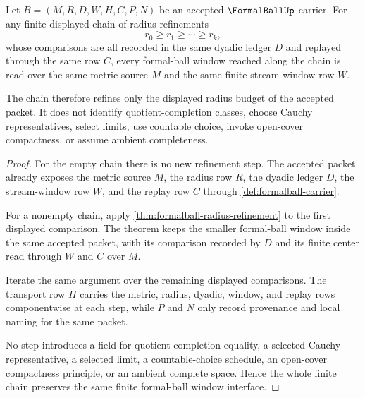 \begin{theorem}
\label{thm:formalball-radius-refinement-chain}
Let $B=(M,R,D,W,H,C,P,N)$ be an accepted $\FormalBallUp$ carrier. For any finite displayed chain of radius refinements
$$
r_0 \ge r_1 \ge \cdots \ge r_k ,
$$
whose comparisons are all recorded in the same dyadic ledger $D$ and replayed through the same row $C$, every formal-ball window reached along the chain is read over the same metric source $M$ and the same finite stream-window row $W$.

The chain therefore refines only the displayed radius budget of the accepted packet. It does not identify quotient-completion classes, choose Cauchy representatives, select limits, use countable choice, invoke open-cover compactness, or assume ambient completeness.
\end{theorem}
\begin{proof}
For the empty chain there is no new refinement step. The accepted packet already exposes the metric source $M$, the radius row $R$, the dyadic ledger $D$, the stream-window row $W$, and the replay row $C$ through \autoref{def:formalball-carrier}.

For a nonempty chain, apply \autoref{thm:formalball-radius-refinement} to the first displayed comparison. The theorem keeps the smaller formal-ball window inside the same accepted packet, with its comparison recorded by $D$ and its finite center read through $W$ and $C$ over $M$.

Iterate the same argument over the remaining displayed comparisons. The transport row $H$ carries the metric, radius, dyadic, window, and replay rows componentwise at each step, while $P$ and $N$ only record provenance and local naming for the same packet.

No step introduces a field for quotient-completion equality, a selected Cauchy representative, a selected limit, a countable-choice schedule, an open-cover compactness principle, or an ambient complete space. Hence the whole finite chain preserves the same finite formal-ball window interface.
\end{proof}

